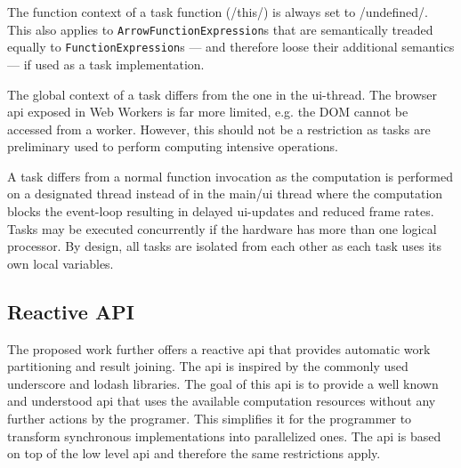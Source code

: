 The function context of a task function (\javascriptinline/this/) is always set to \javascriptinline/undefined/. This also applies to \texttt{ArrowFunctionExpression}s that are semantically treaded equally to \texttt{FunctionExpression}s --- and therefore loose their additional semantics --- if used as a task implementation.

The global context of a task differs from the one in the ui-thread. The browser api exposed in Web Workers is far more limited, e.g. the DOM cannot be accessed from a worker. However, this should not be a restriction as tasks are preliminary used to perform computing intensive operations. 

A task differs from a normal function invocation as the computation is performed on a designated thread instead of in the main/ui thread where the computation blocks the event-loop resulting in delayed ui-updates and reduced frame rates. Tasks may be executed concurrently if the hardware has more than one logical processor. By design, all tasks are isolated from each other as each task uses its own local variables.

\subsection{Reactive API}
The proposed work further offers a reactive api that provides automatic work partitioning and result joining. The api is inspired by the commonly used underscore and lodash libraries. The goal of this api is to provide a well known and understood api that uses the available computation resources without any further actions by the programer. This simplifies it for the programmer to transform synchronous implementations into parallelized ones. The api is based on top of the low level api and therefore the same restrictions apply. 

